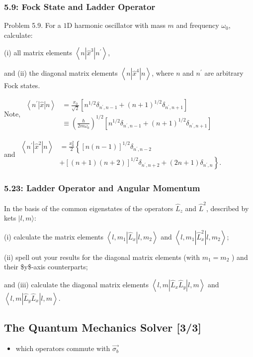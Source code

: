 \documentclass[11pt]{article}
\begin{document}
\subsubsection{5.9: Fock State and Ladder Operator}
\label{sec:orgb927969}
Problem 5.9. For a \(1 \mathrm{D}\) harmonic oscillator with mass \(m\) and
frequency \(\omega_0\), calculate:

(i) all matrix elements \(\left\langle n\left|\hat{x}^3\right| n^{\prime}\right\rangle\),

and (ii) the diagonal matrix elements \(\left\langle n\left|\hat{x}^4\right| n\right\rangle\),
where \(n\) and \(n^{\prime}\) are arbitrary Fock states.


Note, \(\begin{aligned} \left\langle n^{\prime}|\hat{x}| n\right\rangle &
=\frac{x_0}{\sqrt{2}}\left[n^{1 / 2} \delta_{n^{\prime}, n-1}+(n+1)^{1 / 2} \delta_{n^{\prime},
n+1}\right] \\ & \equiv\left(\frac{\hbar}{2 m \omega_0}\right)^{1 / 2}\left[n^{1 / 2}
\delta_{n^{\prime}, n-1}+(n+1)^{1 / 2} \delta_{n^{\prime}, n+1}\right] \end{aligned}\)

and \(\begin{aligned} \left\langle n^{\prime}|\hat{x}^{2}| n\right\rangle & =
\frac{x_0^2}{2}\left\{[n(n-1)]^{1 / 2} \delta_{n^{\prime}, n-2}\right. \\ &
\left.+[(n+1)(n+2)]^{1 / 2} \delta_{n^{\prime}, n+2}+(2 n+1) \delta_{n^{\prime}, n}\right\} .
\end{aligned}\)
\subsubsection{5.23: Ladder Operator and Angular Momentum}
\label{sec:orgc3ea850}
In the basis of the common eigenstates of the operators \(\hat{L}_z\) and
\(\hat{L}^2\), described by kets \(|l, m\rangle\):

(i) calculate the matrix elements \(\left\langle l, m_1\left|\hat{L}_x\right| l,
m_2\right\rangle\) and \(\left\langle l, m_1\left|\hat{L}_x^2\right| l, m_2\right\rangle\);

(ii) spell out your results for the diagonal matrix elements (with \(m_1=m_2\) )
and their \$y\$-axis counterparts;

and (iii) calculate the diagonal matrix elements \(\left\langle l, m\left|\hat{L}_x
\hat{L}_y\right| l, m\right\rangle\) and \(\left\langle l, m\left|\hat{L}_y \hat{L}_x\right|
l, m\right\rangle\).
\subsection{The Quantum Mechanics Solver [3/3]}
\label{sec:org7515327}
\begin{itemize}
\item which operators commute with \(\vec{\sigma_{b}}\)
\end{itemize}
\end{document}
